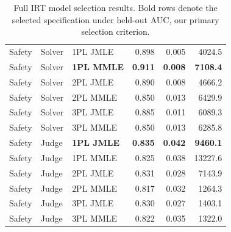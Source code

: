 \begin{table}[t]
\begin{tabular}{lllrrr}
Safety & Solver & 1PL JMLE & 0.898 & 0.005 & 4024.5 \\
Safety & Solver & \textbf{1PL MMLE} & \textbf{0.911} & \textbf{0.008} & \textbf{7108.4} \\
Safety & Solver & 2PL JMLE & 0.890 & 0.008 & 4666.2 \\
Safety & Solver & 2PL MMLE & 0.850 & 0.013 & 6429.9 \\
Safety & Solver & 3PL JMLE & 0.885 & 0.011 & 6089.3 \\
Safety & Solver & 3PL MMLE & 0.850 & 0.013 & 6285.8 \\
Safety & Judge & \textbf{1PL JMLE} & \textbf{0.835} & \textbf{0.042} & \textbf{9460.1} \\
Safety & Judge & 1PL MMLE & 0.825 & 0.038 & 13227.6 \\
Safety & Judge & 2PL JMLE & 0.831 & 0.028 & 7143.9 \\
Safety & Judge & 2PL MMLE & 0.817 & 0.032 & 1264.3 \\
Safety & Judge & 3PL JMLE & 0.830 & 0.027 & 1403.1 \\
Safety & Judge & 3PL MMLE & 0.822 & 0.035 & 1322.0 \\
\bottomrule
\end{tabular}
\caption{Full IRT model selection results. Bold rows denote the selected specification under held-out AUC, our primary selection criterion.}
\label{tab:irt_model_selection}
\end{table}
